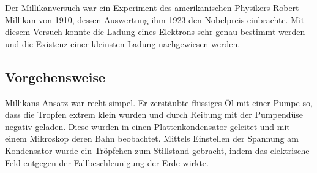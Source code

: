 




%
%	






Der Millikanversuch war ein Experiment des amerikanischen Physikers Robert Millikan von 1910, dessen Auswertung ihm 1923 den Nobelpreis einbrachte. Mit diesem Versuch konnte die Ladung eines Elektrons sehr genau bestimmt werden und die Existenz einer kleinsten Ladung nachgewiesen werden.

\subsection{Vorgehensweise}

Millikans Ansatz war recht simpel. Er zerstäubte flüssiges Öl mit einer Pumpe so, dass die Tropfen extrem klein wurden und durch Reibung mit der Pumpendüse negativ geladen. Diese wurden in einen Plattenkondensator geleitet und mit einem Mikroskop deren Bahn beobachtet. Mittels Einstellen der Spannung am Kondensator wurde ein Tröpfchen zum Stillstand gebracht, indem das elektrische Feld entgegen der Fallbeschleunigung der Erde wirkte.

